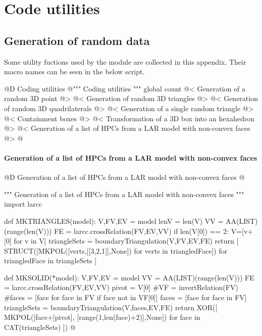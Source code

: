 \documentclass[11pt,oneside]{article}    %
\begin{document}
\appendix
\section{Code utilities}

\subsection{Generation of random data}

Some utility fuctions used by the module are collected in this appendix. Their macro names can be seen in the below script.

@D Coding utilities
@{""" Coding utilities """
global count
@< Generation of a random 3D point @>
@< Generation of random 3D triangles @>
@< Generation of random 3D quadrilaterals @>
@< Generation of a single random triangle @>
@< Containment boxes @>
@< Transformation of a 3D box into an hexahedron @>
@< Generation of a list of HPCs from a LAR model with non-convex faces @>
@}


\paragraph{Generation of a list of HPCs from a LAR model with non-convex faces}

@D Generation of a list of HPCs from a LAR model with non-convex faces
@{""" Generation of a list of HPCs from a LAR model with non-convex faces """
import larcc

def MKTRIANGLES(model): 
    V,FV,EV = model
    lenV = len(V)
    VV = AA(LIST)(range(len(V)))
    FE = larcc.crossRelation(FV,EV,VV)
    if len(V[0]) == 2: V=[v+[0] for v in V]
    triangleSets = boundaryTriangulation(V,FV,EV,FE)
    return [ STRUCT([MKPOL([verts,[[3,2,1]],None]) for verts in triangledFace]) 
        for triangledFace in triangleSets ]

def MKSOLID(*model): 
    V,FV,EV = model
    VV = AA(LIST)(range(len(V)))
    FE = larcc.crossRelation(FV,EV,VV)
    pivot = V[0]
    #VF = invertRelation(FV) 
    #faces = [face for face in FV if face not in VF[0]]
    faces = [face for face in FV]
    triangleSets = boundaryTriangulation(V,faces,EV,FE)
    return XOR([ MKPOL([face+[pivot], [range(1,len(face)+2)],None])
        for face in CAT(triangleSets) ])
@}
\end{document}
